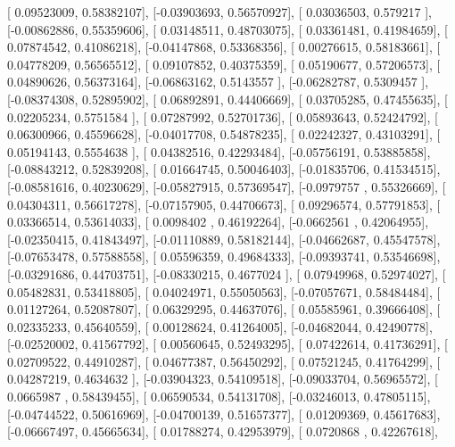 \documentclass{article}
\begin{document}
       [ 0.09523009,  0.58382107],
       [-0.03903693,  0.56570927],
       [ 0.03036503,  0.579217  ],
       [-0.00862886,  0.55359606],
       [ 0.03148511,  0.48703075],
       [ 0.03361481,  0.41984659],
       [ 0.07874542,  0.41086218],
       [-0.04147868,  0.53368356],
       [ 0.00276615,  0.58183661],
       [ 0.04778209,  0.56565512],
       [ 0.09107852,  0.40375359],
       [ 0.05190677,  0.57206573],
       [ 0.04890626,  0.56373164],
       [-0.06863162,  0.5143557 ],
       [-0.06282787,  0.5309457 ],
       [-0.08374308,  0.52895902],
       [ 0.06892891,  0.44406669],
       [ 0.03705285,  0.47455635],
       [ 0.02205234,  0.5751584 ],
       [ 0.07287992,  0.52701736],
       [ 0.05893643,  0.52424792],
       [ 0.06300966,  0.45596628],
       [-0.04017708,  0.54878235],
       [ 0.02242327,  0.43103291],
       [ 0.05194143,  0.5554638 ],
       [ 0.04382516,  0.42293484],
       [-0.05756191,  0.53885858],
       [-0.08843212,  0.52839208],
       [ 0.01664745,  0.50046403],
       [-0.01835706,  0.41534515],
       [-0.08581616,  0.40230629],
       [-0.05827915,  0.57369547],
       [-0.0979757 ,  0.55326669],
       [ 0.04304311,  0.56617278],
       [-0.07157905,  0.44706673],
       [ 0.09296574,  0.57791853],
       [ 0.03366514,  0.53614033],
       [ 0.0098402 ,  0.46192264],
       [-0.0662561 ,  0.42064955],
       [-0.02350415,  0.41843497],
       [-0.01110889,  0.58182144],
       [-0.04662687,  0.45547578],
       [-0.07653478,  0.57588558],
       [ 0.05596359,  0.49684333],
       [-0.09393741,  0.53546698],
       [-0.03291686,  0.44703751],
       [-0.08330215,  0.4677024 ],
       [ 0.07949968,  0.52974027],
       [ 0.05482831,  0.53418805],
       [ 0.04024971,  0.55050563],
       [-0.07057671,  0.58484484],
       [ 0.01127264,  0.52087807],
       [ 0.06329295,  0.44637076],
       [ 0.05585961,  0.39666408],
       [ 0.02335233,  0.45640559],
       [ 0.00128624,  0.41264005],
       [-0.04682044,  0.42490778],
       [-0.02520002,  0.41567792],
       [ 0.00560645,  0.52493295],
       [ 0.07422614,  0.41736291],
       [ 0.02709522,  0.44910287],
       [ 0.04677387,  0.56450292],
       [ 0.07521245,  0.41764299],
       [ 0.04287219,  0.4634632 ],
       [-0.03904323,  0.54109518],
       [-0.09033704,  0.56965572],
       [ 0.0665987 ,  0.58439455],
       [ 0.06590534,  0.54131708],
       [-0.03246013,  0.47805115],
       [-0.04744522,  0.50616969],
       [-0.04700139,  0.51657377],
       [ 0.01209369,  0.45617683],
       [-0.06667497,  0.45665634],
       [ 0.01788274,  0.42953979],
       [ 0.0720868 ,  0.42267618],
\end{document}
